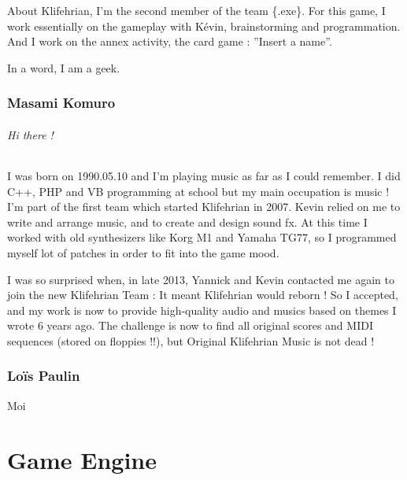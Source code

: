 \documentclass[a4paper,12pt]{book}
\begin{document}
About Klifehrian, I'm the second member of the team \{.exe\}. For this game, I work essentially on the gameplay with K\'{e}vin, brainstorming and programmation. And I work on the annex activity, the card game : ''Insert a name''.

In a word, I am a geek.
\section*{Masami Komuro}
\paragraph{Hi there !} I was born on 1990.05.10 and I'm playing music as far as I could remember. I did C++, PHP and VB programming at school but my main occupation is music ! I'm part of the first team which started Klifehrian in 2007. Kevin relied on me to write and arrange music, and to create and design sound fx. At this time I worked with old synthesizers like Korg M1 and Yamaha TG77, so I programmed myself lot of patches in order to fit into the game mood.

I was so surprised when, in late 2013, Yannick and Kevin contacted me again to join the new Klifehrian Team : It meant Klifehrian would reborn ! So I accepted, and my work is now to provide high-quality audio and musics based on themes I wrote 6 years ago. The challenge is now to find all original scores and MIDI sequences (stored on floppies !!), but Original Klifehrian Music is not dead !
\section*{Lo\"{i}s Paulin}
Moi
\part{Game Engine}
\end{document}
